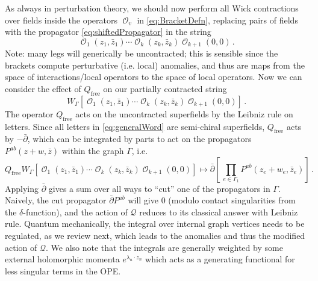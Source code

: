\documentclass[11pt]{article}
\DeclareMathOperator{\calO}{\mathcal{O}}
\DeclareMathOperator{\free}{{\mathrm{free}}}
\renewcommand{\bm}{\mathcal}
\begin{document}
As always in perturbation theory, we should now perform all Wick contractions over fields inside the operators $\calO_v$ in \eqref{eq:BracketDefn}, replacing pairs of fields with the propagator \eqref{eq:shiftedPropagator} in the string
\begin{equation}
    \calO_1(z_1,\bar{z}_1)\cdots \calO_k(z_k,\bar{z}_k)\!\calO_{k+1}(0,0)\,.
\end{equation}
Note: many legs will generically be uncontracted; this is sensible since the brackets compute perturbative (i.e. local) anomalies, and thus are maps from the space of interactions/local operators to the space of local operators. Now we can consider the effect of $Q_{\free}$ on our partially contracted string
\begin{equation}
    W_{\Gamma}[\calO_1(z_1,\bar{z}_1)\cdots \calO_k(z_k,\bar{z}_k)\!\calO_{k+1}(0,0)]\,.
\end{equation}
The operator $Q_{\mathrm{free}}$ acts on the uncontracted superfields by the Leibniz rule on letters. Since all letters in \eqref{eq:generalWord} are semi-chiral superfields, $Q_{\free}$ acts by $-\bar\partial$, which can be integrated by parts to act on the propagators $P^{ab}(z+w,\bar{z})$ within the graph $\Gamma$, i.e.
\begin{equation}
   Q_{\free} W_{\Gamma}[\calO_1(z_1,\bar{z}_1)\cdots \calO_k(z_k,\bar{z}_k)\calO_{k+1}(0,0)]
        \mapsto \bar\partial\left[\,\prod_{e\in \Gamma_1} P^{ab}(z_e+w_e,\bar{z}_e)\right]\,.
\end{equation}
Applying $\bar\partial$ gives a sum over all ways to ``cut'' one of the propagators in $\Gamma$. Naively, the cut propagator $\bar\partial P^{ab}$ will give $0$ (modulo contact singularities from the $\delta$-function), and the action of $\bm{Q}$ reduces to its classical answer with Leibniz rule. Quantum mechanically, the integral over internal graph vertices needs to be regulated, as we review next, which leads to the anomalies and thus the modified action of $\bm{Q}$. We also note that the integrals are generally weighted by some external holomorphic momenta $e^{\lambda_n\cdot z_n}$ which acts as a generating functional for less singular terms in the OPE.
\end{document}
